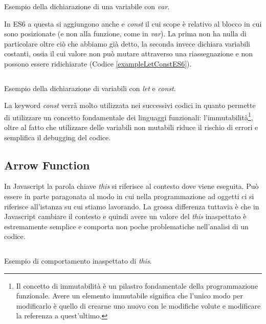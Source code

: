 \begin{listing}[ht]
\inputminted{Javascript}{sources/exampleVarES5.js}
\caption{Esempio della dichiarazione di una variabile con \textit{var}.}
\label{exampleVarES5}
\end{listing}

In ES6 a questa si aggiungono anche  e \textit{const} il cui scope è relativo al blocco in cui sono posizionate (e non alla funzione, come in \textit{var}). La prima non ha nulla di particolare oltre ciò che abbiamo già detto, la seconda invece dichiara variabili costanti, ossia il cui valore non può mutare attraverso una riassegnazione e non possono essere ridichiarate (Codice \ref{exampleLetConstES6}).

\begin{listing}[ht]
\inputminted{Javascript}{sources/exampleLetConstES6.js}
\caption{Esempio della dichiarazione di variabili con \textit{let} e \textit{const}.}
\label{exampleLetConstES6}
\end{listing}

\noindent
La keyword \textit{const} verrà molto utilizzata nei successivi codici in quanto permette di utilizzare un concetto fondamentale dei linguaggi funzionali: l'immutabilità\footnote{Il concetto di immutabilità è un pilastro fondamentale della programmazione funzionale. Avere un elemento immutabile significa che l'unico modo per modificarlo è quello di crearne uno nuovo con le modifiche volute e modificare la referenza a quest'ultimo.}, oltre al fatto che utilizzare delle variabili non mutabili riduce il rischio di errori e semplifica il debugging del codice.

\subsection{Arrow Function}
In Javascript la parola chiave \textit{this} si riferisce al contesto dove viene eseguita. Può essere in parte paragonata al modo in cui nella programmazione ad oggetti ci si riferisce all'istanza su cui stiamo lavorando. La grossa differenza tuttavia è che in Javascript cambiare il contesto e quindi avere un valore del \textit{this} inaspettato è estremamente semplice e comporta non poche problematiche nell'analisi di un codice.

\begin{listing}[ht]
\inputminted{Javascript}{sources/exampleShadowThisES5.js}
\caption{Esempio di comportamento inaspettato di \textit{this}.}
\label{exampleShadowThisES5}
\end{listing}

